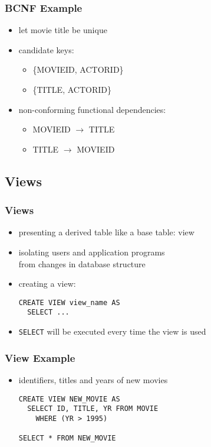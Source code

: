 \documentclass[dvipsnames]{beamer}
\begin{document}
\begin{frame}
  \frametitle{BCNF Example}

  \begin{itemize}
    \item let movie title be unique
    \item candidate keys:
    \begin{itemize}
      \item \{MOVIEID, ACTORID\}
      \item \{TITLE, ACTORID\}
    \end{itemize}

    \pause
    \item non-conforming functional dependencies:
    \begin{itemize}
      \item MOVIEID $\rightarrow$ TITLE
      \item TITLE $\rightarrow$ MOVIEID
    \end{itemize}
  \end{itemize}
\end{frame}

\subsection{Views}

\lstset{language=ExtendedSQL}

\begin{frame}[fragile]
  \frametitle{Views}

  \begin{itemize}
    \item presenting a derived table like a base table: \alert{view}
    \item isolating users and application programs\\
      from changes in database structure

    \pause
    \bigskip
    \item creating a view:
    \begin{lstlisting}
CREATE VIEW view_name AS
  SELECT ...
    \end{lstlisting}

    \medskip
    \item \lstinline!SELECT! will be executed every time the view is used
  \end{itemize}
\end{frame}

\begin{frame}[fragile]
  \frametitle{View Example}

  \begin{itemize}
    \item identifiers, titles and years of new movies

    \medskip
    \begin{lstlisting}
CREATE VIEW NEW_MOVIE AS
  SELECT ID, TITLE, YR FROM MOVIE
    WHERE (YR > 1995)

SELECT * FROM NEW_MOVIE
    \end{lstlisting}
  \end{itemize}
\end{frame}
\end{document}
